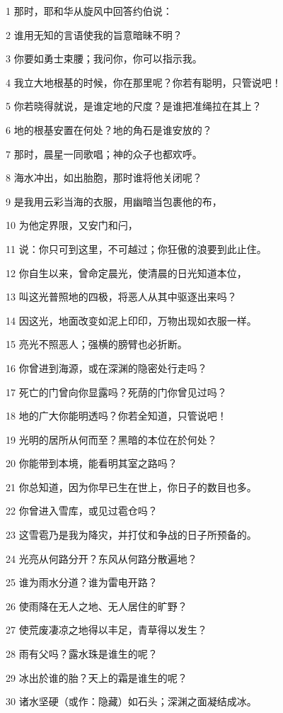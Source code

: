 \par 1 那时，耶和华从旋风中回答约伯说：
\par 2 谁用无知的言语使我的旨意暗昧不明？
\par 3 你要如勇士束腰；我问你，你可以指示我。
\par 4 我立大地根基的时候，你在那里呢？你若有聪明，只管说吧！
\par 5 你若晓得就说，是谁定地的尺度？是谁把准绳拉在其上？
\par 6 地的根基安置在何处？地的角石是谁安放的？
\par 7 那时，晨星一同歌唱；神的众子也都欢呼。
\par 8 海水冲出，如出胎胞，那时谁将他关闭呢？
\par 9 是我用云彩当海的衣服，用幽暗当包裹他的布，
\par 10 为他定界限，又安门和闩，
\par 11 说：你只可到这里，不可越过；你狂傲的浪要到此止住。
\par 12 你自生以来，曾命定晨光，使清晨的日光知道本位，
\par 13 叫这光普照地的四极，将恶人从其中驱逐出来吗？
\par 14 因这光，地面改变如泥上印印，万物出现如衣服一样。
\par 15 亮光不照恶人；强横的膀臂也必折断。
\par 16 你曾进到海源，或在深渊的隐密处行走吗？
\par 17 死亡的门曾向你显露吗？死荫的门你曾见过吗？
\par 18 地的广大你能明透吗？你若全知道，只管说吧！
\par 19 光明的居所从何而至？黑暗的本位在於何处？
\par 20 你能带到本境，能看明其室之路吗？
\par 21 你总知道，因为你早已生在世上，你日子的数目也多。
\par 22 你曾进入雪库，或见过雹仓吗？
\par 23 这雪雹乃是我为降灾，并打仗和争战的日子所预备的。
\par 24 光亮从何路分开？东风从何路分散遍地？
\par 25 谁为雨水分道？谁为雷电开路？
\par 26 使雨降在无人之地、无人居住的旷野？
\par 27 使荒废凄凉之地得以丰足，青草得以发生？
\par 28 雨有父吗？露水珠是谁生的呢？
\par 29 冰出於谁的胎？天上的霜是谁生的呢？
\par 30 诸水坚硬（或作：隐藏）如石头；深渊之面凝结成冰。
